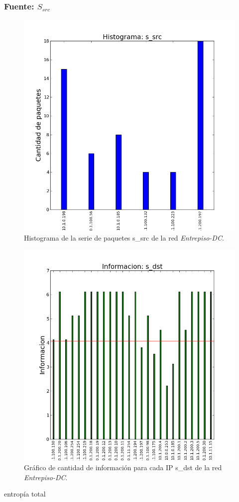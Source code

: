 \documentclass[10pt, a4paper]{article}
\begin{document}
\subsubsection{Fuente: $S_{src}$}

\begin{figure}[H]
  \begin{center}
    \includegraphics[width=0.8\linewidth]{../imgs/entrepiso-dc-ips_s_src_hist.png}
    \caption{Histograma de la serie de paquetes s\_src de la red \emph{Entrepiso-DC}.}
    \label{fig:histograma-entrepiso-dc-s-src}
  \end{center}
\end{figure}
\begin{figure}[H]
  \begin{center}
    \includegraphics[width=0.8\linewidth]{../imgs/entrepiso-dc-ips_s_dst_info.png}
    \caption{Gráfico de cantidad de información para cada IP s\_dst de la red \emph{Entrepiso-DC}.}
    \label{fig:informacion-entrepiso-dc-s-src}
  \end{center}
\end{figure}
entropía total
\end{document}
